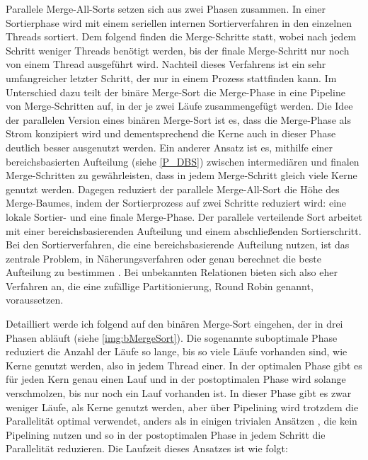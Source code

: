 \documentclass[a4paper,12pt,twoside]{article}
\begin{document}
{Parallele Merge-All-Sorts \parencite[S. 831f]{Taniar2000} setzen sich aus zwei Phasen zusammen. In einer Sortierphase wird mit einem seriellen internen Sortierverfahren in den einzelnen Threads sortiert. Dem folgend finden die Merge-Schritte statt, wobei nach jedem Schritt weniger Threads benötigt werden, bis der finale Merge-Schritt nur noch von einem Thread ausgeführt wird. Nachteil dieses Verfahrens ist ein sehr umfangreicher letzter Schritt, der nur in einem Prozess stattfinden kann. Im Unterschied dazu teilt der binäre Merge-Sort \parencite[S. 832f]{Taniar2000} die Merge-Phase in eine Pipeline von Merge-Schritten auf, in der je zwei Läufe zusammengefügt werden. Die Idee der parallelen Version eines binären Merge-Sort \parencite[S. 833]{Taniar2000} ist es, dass die Merge-Phase als Strom konzipiert wird und dementsprechend die Kerne auch in dieser Phase deutlich besser ausgenutzt werden. Ein anderer Ansatz ist es, mithilfe einer bereichsbasierten Aufteilung (siehe \autoref{P_DBS}) zwischen intermediären und finalen Merge-Schritten zu gewährleisten, dass in jedem Merge-Schritt gleich viele Kerne genutzt werden. Dagegen reduziert der parallele Merge-All-Sort \parencite[S. 833f]{Taniar2000} die Höhe des Merge-Baumes, indem der Sortierprozess auf zwei Schritte reduziert wird: eine lokale Sortier- und eine finale Merge-Phase. Der parallele verteilende Sort arbeitet mit einer bereichsbasierenden Aufteilung und einem abschließenden Sortierschritt. Bei den Sortierverfahren, die eine bereichsbasierende Aufteilung nutzen, ist das zentrale Problem, in Näherungsverfahren oder genau berechnet die beste Aufteilung zu bestimmen \parencite{Lu1994, Iyer1989}. Bei unbekannten Relationen bieten sich also eher Verfahren an, die eine zufällige Partitionierung, Round Robin genannt, voraussetzen.

Detailliert werde ich \textcite[S. 333ff]{Bitton1983} folgend auf den binären Merge-Sort eingehen, der in drei Phasen abläuft (siehe \autoref{img:bMergeSort}). Die sogenannte suboptimale Phase reduziert die Anzahl der Läufe so lange, bis so viele Läufe vorhanden sind, wie Kerne genutzt werden, also in jedem Thread einer. In der optimalen Phase gibt es für jeden Kern genau einen Lauf und in der postoptimalen Phase wird solange verschmolzen, bis nur noch ein Lauf vorhanden ist. In dieser Phase gibt es zwar weniger Läufe, als Kerne genutzt werden, aber über Pipelining wird trotzdem die Parallelität optimal verwendet, anders als in einigen trivialen Ansätzen \parencite{Yu1998}, die kein Pipelining nutzen und so in der postoptimalen Phase in jedem Schritt die Parallelität reduzieren. Die Laufzeit dieses Ansatzes ist wie folgt:

}
\end{document}
